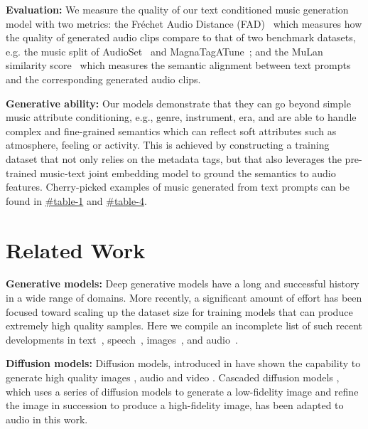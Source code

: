 \textbf{Evaluation:} We measure the quality of our text conditioned music generation model with two metrics: the Fr\'echet Audio Distance (FAD)~\cite{kilgour2018fr} which measures how the quality of generated audio clips compare to that of two benchmark datasets, e.g. the music split of AudioSet~\cite{gemmeke2017audio} and MagnaTagATune~\cite{law2009evaluation}; and the MuLan similarity score~\cite{mulan2022} which measures the semantic alignment between text prompts and the corresponding generated audio clips. 

\textbf{Generative ability:} Our models demonstrate that they can go beyond simple music attribute conditioning, e.g., genre, instrument, era, and are able to handle complex and fine-grained semantics which can reflect soft attributes such as atmosphere, feeling or activity. This is achieved by constructing a training dataset that not only relies on the metadata tags, but that also leverages the pre-trained music-text joint embedding model to ground the semantics to audio features. Cherry-picked examples of music generated from text prompts can be found in  \href{\website#table-1}{\websiteDisplay\#table-1} and \href{\website#table-4}{\websiteDisplay\#table-4}.

\section{Related Work}
\noindent\textbf{Generative models:}
Deep generative models have a long and successful history in a wide range of domains. More recently, a significant amount of effort has been focused toward scaling up the dataset size for training models that can produce extremely high quality samples. Here we compile an incomplete list of such recent developments in text~\cite{brown2020language,thoppilan2022lamda}, speech~\cite{wang2018style, chen2021wavegrad,audiolm}, images~\cite{ramesh2022hierarchical,saharia2022photorealistic,yu2022scaling}, and audio~\cite{briot2021artificial,dhariwal2020jukebox,mubert,kreuk2022audiogen}. 
 

\noindent\textbf{Diffusion models:}
Diffusion models, introduced in \cite{sohl2015deep,song2019generative,ho2020denoising} have shown the capability to generate high quality images \cite{ho2020denoising,ho2022cascaded}, audio \cite{yang2022diffsound, popov2021grad} and video \cite{ho2022video,ho2022imagen}. Cascaded diffusion models \cite{ho2022cascaded,saharia2022photorealistic}, which uses a series of diffusion models to generate a low-fidelity image and refine the image in succession to produce a high-fidelity image, has been adapted to audio in this work.


